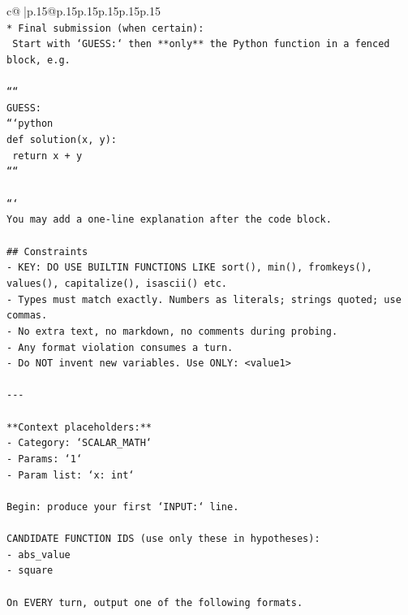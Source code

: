 \documentclass{article}
\begin{document}
{\begin{supertabular}{c@{$\;$}|p{.15\linewidth}@{}p{.15\linewidth}p{.15\linewidth}p{.15\linewidth}p{.15\linewidth}p{.15\linewidth}}
{{{\\ 
\texttt{* Final submission (when certain):} \\
\texttt{  Start with `GUESS:` then **only** the Python function in a fenced block, e.g.} \\
\\ 
\texttt{````} \\
\texttt{GUESS:} \\
\texttt{```python} \\
\texttt{def solution(x, y):} \\
\texttt{    return x + y} \\
\texttt{````} \\
\\ 
\texttt{```} \\
\texttt{You may add a one{-}line explanation after the code block.} \\
\\ 
\texttt{\#\# Constraints} \\
\texttt{{-} KEY: DO USE BUILTIN FUNCTIONS LIKE sort(), min(), fromkeys(), values(), capitalize(), isascii() etc.} \\
\texttt{{-} Types must match exactly. Numbers as literals; strings quoted; use commas.} \\
\texttt{{-} No extra text, no markdown, no comments during probing.} \\
\texttt{{-} Any format violation consumes a turn.} \\
\texttt{{-} Do NOT invent new variables. Use ONLY: <value1>} \\
\\ 
\texttt{{-}{-}{-}} \\
\\ 
\texttt{**Context placeholders:**} \\
\texttt{{-} Category: `SCALAR\_MATH`} \\
\texttt{{-} Params: `1`} \\
\texttt{{-} Param list: `x: int`} \\
\\ 
\texttt{Begin: produce your first `INPUT:` line.} \\
\\ 
\texttt{CANDIDATE FUNCTION IDS (use only these in hypotheses):} \\
\texttt{{-} abs\_value} \\
\texttt{{-} square} \\
\\ 
\texttt{On EVERY turn, output one of the following formats.} \\
}}}
\end{supertabular}}
\end{document}
